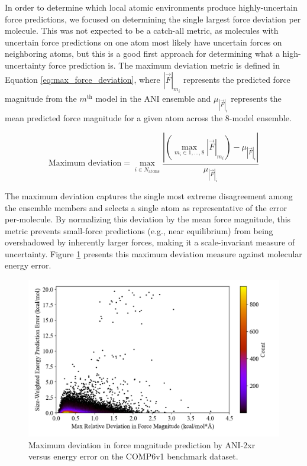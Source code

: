 In order to determine which local atomic environments produce highly-uncertain force predictions, we focused on determining the single largest force deviation per molecule.
This was not expected to be a catch-all metric, as molecules with uncertain force predictions on one atom most likely have uncertain forces on neighboring atoms, but this is a good first approach for determining what a high-uncertainty force prediction is.
The maximum deviation metric is defined in Equation \ref{eq:max_force_deviation}, where $|\vec{F}|_{m_i}$ represents the predicted force magnitude from the $m^{\text{th}}$ model in the ANI ensemble and $\mu_{|\vec{F}|_i}$ represents the mean predicted force magnitude for a given atom across the 8-model ensemble.

\begin{equation} 
\text{Maximum deviation} = 
\max\limits_{i \in N_{\text{atoms}}}
\frac{\left| \left(\max\limits_{m_i \in {1, \dots, 8}} |\vec{F}|_{m_i} \right)- {\mu_{|\vec{F}|_i}} \right|}{\mu_{|\vec{F}|_i}} 
\label{eq:max_force_deviation}
\end{equation}

The maximum deviation captures the single most extreme disagreement among the ensemble members and selects a single atom as representative of the error per-molecule. 
By normalizing this deviation by the mean force magnitude, this metric prevents small-force predictions (e.g., near equilibrium) from being overshadowed by inherently larger forces, making it a scale-invariant measure of uncertainty.
Figure \ref{fig:2xr_comp6v1-forces-highest_deviation} presents this maximum deviation measure against molecular energy error. 

\begin{figure}[!h]
    \centering
    \includegraphics[width=1\linewidth]{Images/2xr_forces/2xr_comp6v1_force-highest-force_deviation-vs-energy.png}
    \caption[Maximum deviation in force magnitude prediction versus energy error (COMP6v1)]{Maximum deviation in force magnitude prediction by ANI-2xr versus energy error on the COMP6v1 benchmark dataset.}
    \label{fig:2xr_comp6v1-forces-highest_deviation}
\end{figure}

